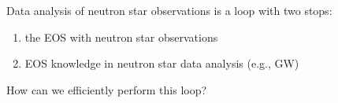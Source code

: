 \def\x{2mm}
\def\y{1mm}

Data analysis of neutron star observations is a loop with two stops:

\vspace{\y}
\begin{enumerate}
    \item {} the EOS with neutron star observations

    \vspace{\x}
    
    \item {} EOS knowledge in neutron star data analysis (e.g., GW)
\end{enumerate}

\vspace{\x}

How can we efficiently perform this loop?

\vspace{\y}

\centering
{}    